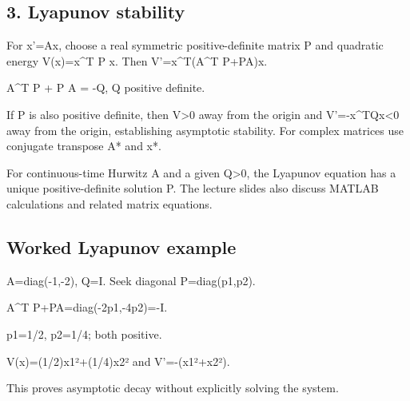 \documentclass[11pt,a4paper]{article}
\begin{document}
\subsection{3. Lyapunov stability}
\begin{conceptbox}For x'=Ax, choose a real symmetric positive-definite matrix P and quadratic energy V(x)=x\textasciicircum{}T P x. Then V'=x\textasciicircum{}T(A\textasciicircum{}T P+PA)x.\end{conceptbox}
\begin{equationbox}\raggedright
{\ttfamily\small A\textasciicircum{}T P + P A = -Q, Q positive definite.}\par
\end{equationbox}
\begin{conceptbox}If P is also positive definite, then V>0 away from the origin and V'=-x\textasciicircum{}TQx<0 away from the origin, establishing asymptotic stability. For complex matrices use conjugate transpose A* and x*.\end{conceptbox}
\begin{conceptbox}For continuous-time Hurwitz A and a given Q>0, the Lyapunov equation has a unique positive-definite solution P. The lecture slides also discuss MATLAB calculations and related matrix equations.\end{conceptbox}

\subsection{Worked Lyapunov example}
\begin{equationbox}\raggedright
{\ttfamily\small A=diag(-1,-2), Q=I. Seek diagonal P=diag(p1,p2).}\par
\end{equationbox}
\begin{equationbox}\raggedright
{\ttfamily\small A\textasciicircum{}T P+PA=diag(-2p1,-4p2)=-I.}\par
\end{equationbox}
\begin{equationbox}\raggedright
{\ttfamily\small p1=1/2, p2=1/4; both positive.}\par
\end{equationbox}
\begin{equationbox}\raggedright
{\ttfamily\small V(x)=(1/2)x1²+(1/4)x2² and V'=-(x1²+x2²).}\par
\end{equationbox}
\begin{conceptbox}This proves asymptotic decay without explicitly solving the system.\end{conceptbox}
\end{document}
